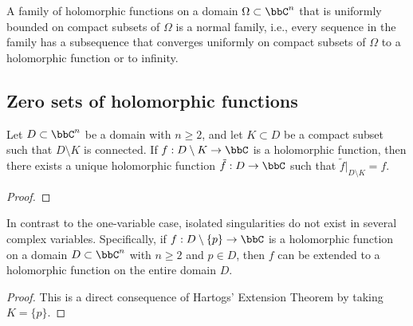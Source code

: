     \begin{theorem}\label{thm:Montel's_Theorem}
        A family of holomorphic functions on a domain \(\Omega \subset \bbC^n\) that is uniformly bounded on compact subsets of \(\Omega\) is a normal family, i.e., every sequence in the family has a subsequence that converges uniformly on compact subsets of \(\Omega\) to a holomorphic function or to infinity.
    \end{theorem}

\subsection{Zero sets of holomorphic functions}

    \begin{theorem}\label{thm:Hartogs'_Extension_Theorem}
        Let \(D \subset \bbC^n\) be a domain with \(n \geq 2\), and let \(K \subset D\) be a compact subset such that \(D \setminus K\) is connected. 
        If \(f: D \setminus K \to \bbC\) is a holomorphic function, then there exists a unique holomorphic function \(\tilde{f}: D \to \bbC\) such that \(\tilde{f}|_{D \setminus K} = f\).
    \end{theorem}
    \begin{proof}
    \end{proof}


    \begin{corollary}\label{cor:nonexistence_of_isolated_singularities_in_several_complex_variables}
        In contrast to the one-variable case, isolated singularities do not exist in several complex variables. 
        Specifically, if \(f: D \setminus \{p\} \to \bbC\) is a holomorphic function on a domain \(D \subset \bbC^n\) with \(n \geq 2\) and \(p \in D\), then \(f\) can be extended to a holomorphic function on the entire domain \(D\).
    \end{corollary}
    \begin{proof}
        This is a direct consequence of Hartogs' Extension Theorem by taking \(K = \{p\}\).
    \end{proof}

